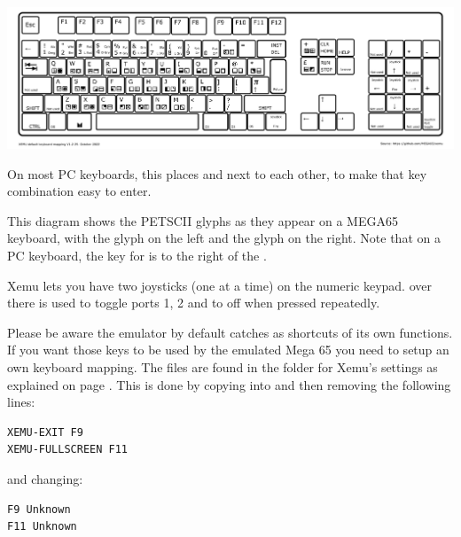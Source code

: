 \begin{center}
  \includegraphics[width=\linewidth]{images/xemu-extended-keyboard.png}
\end{center}

On most PC keyboards, this places  and  next to each
other, to make that key combination easy to enter.

This diagram shows the PETSCII glyphs as they appear on a MEGA65 keyboard, with the
\megasymbolkey glyph on the left and the  glyph on the right. Note
that on a PC keyboard, the key for \megasymbolkey is to the right of the
.

Xemu lets you have two joysticks (one at a time) on the numeric keypad.
 over there is used to toggle ports 1, 2 and to off when pressed
repeatedly.

Please be aware the emulator by default catches  
 as shortcuts of its own functions. If you want those keys to be used by
the emulated Mega 65 you need to setup an own keyboard mapping. The files are found
in the folder for Xemu's settings as explained on page
\pageref{sec:sdcard-settings-location}. This is done by copying
 into  and then removing the following lines:

\begin{tcolorbox}[colback=black,coltext=white]
\verbatimfont{\codefont}
\begin{verbatim}
XEMU-EXIT F9
XEMU-FULLSCREEN F11
\end{verbatim}
\end{tcolorbox}

and changing:

\begin{tcolorbox}[colback=black,coltext=white]
\verbatimfont{\codefont}
\begin{verbatim}
F9 Unknown
F11 Unknown
\end{verbatim}
\end{tcolorbox}

